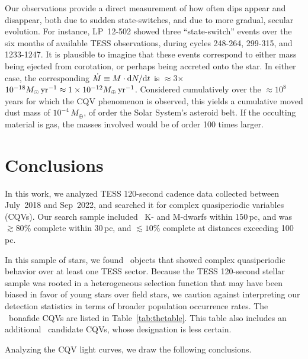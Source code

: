 \documentclass[11pt,twocolumn,tighten]{aastex63}
\begin{document}
Our observations provide a direct measurement of how often dips
appear and disappear, both due to sudden state-switches, and
due to more gradual, secular evolution.  For instance, LP~12-502
showed three ``state-switch'' events over the six months of available TESS
observations, during cycles 248-264, 299-315, and 1233-1247.  It is
plausible to imagine that these events correspond to either mass being
ejected from corotation, or perhaps being accreted onto the star.  In
either case, the corresponding $\dot{M} \equiv M\cdot {\rm d}N/{\rm d}t$
is $\approx$3$\times$$10^{-18} M_\odot\,{\rm yr}^{-1} \approx
1\times10^{-12} M_\oplus\,{\rm yr}^{-1}$.  Considered cumulatively
over the $\approx$$10^8$ years for which the CQV phenomenon is
observed, this yields a cumulative moved dust mass of
$10^{-4}\,M_\oplus$, of order the Solar System's asteroid belt.
If the occulting material is gas, the masses involved would be of
order 100 times larger.




\section{Conclusions}
\label{sec:conclusion}

In this work, we analyzed TESS 120-second cadence data collected
between July~2018 and Sep~2022, and searched it for complex
quasiperiodic variables (CQVs).  Our search sample included
\nstarssearched\ K- and M-dwarfs within 150\,pc, and was $\gtrsim
80\%$ complete within 30\,pc, and $\lesssim 10\%$ complete at
distances exceeding 100\,pc.

In this sample of stars, we found \ngoods\ objects that showed complex
quasiperiodic behavior over at least one TESS sector.  Because the
TESS 120-second stellar sample was rooted in a heterogeneous selection
function that may have been biased in favor of young stars over field
stars, we caution against interpreting our detection statistics in
terms of broader population occurrence rates.  The \ngoods\ bonafide
CQVs are listed in Table~\ref{tab:thetable}.  This table also includes
an additional \nmaybes\ candidate CQVs, whose designation is less
certain.

Analyzing the CQV light curves, we draw the following conclusions.
\end{document}

